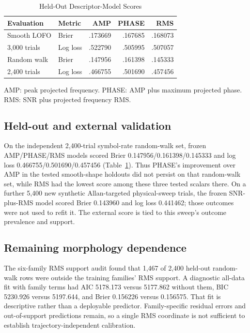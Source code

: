 \documentclass[conference]{IEEEtran}
\begin{document}
\begin{table}[t]
\caption{Held-Out Descriptor-Model Scores}
\label{tab:descriptors}
\centering\footnotesize
\begin{tabular}{llrrr}
\toprule
Evaluation & Metric & AMP & PHASE & RMS \\
\midrule
Smooth LOFO & Brier & .173669 & .167685 & .168073 \\
3,000 trials & Log loss & .522790 & .505995 & .507057 \\
Random walk & Brier & .147956 & .161398 & .145333 \\
2,400 trials & Log loss & .466755 & .501690 & .457456 \\
\bottomrule
\end{tabular}
\vspace{2pt}
\parbox{\columnwidth}{\footnotesize AMP: peak projected frequency. PHASE: AMP plus maximum projected phase. RMS: SNR plus projected frequency RMS.}
\end{table}

\subsection{Held-out and external validation}
On the independent 2,400-trial symbol-rate random-walk set, frozen AMP/PHASE/RMS models scored Brier 0.147956/0.161398/0.145333 and log loss 0.466755/0.501690/0.457456 (Table~\ref{tab:descriptors}). Thus PHASE's improvement over AMP in the tested smooth-shape holdouts did not persist on that random-walk set, while RMS had the lowest score among these three tested scalars there. On a further 5,400 new synthetic Allan-targeted physical-sweep trials, the frozen SNR-plus-RMS model scored Brier 0.143960 and log loss 0.441462; those outcomes were not used to refit it. The external score is tied to this sweep's outcome prevalence and support.

\subsection{Remaining morphology dependence}
The six-family RMS support audit found that 1,467 of 2,400 held-out random-walk rows were outside the training families' RMS support. A diagnostic all-data fit with family terms had AIC 5178.173 versus 5177.862 without them, BIC 5230.926 versus 5197.644, and Brier 0.156226 versus 0.156575. That fit is descriptive rather than a deployable predictor. Family-specific residual errors and out-of-support predictions remain, so a single RMS coordinate is not sufficient to establish trajectory-independent calibration.
\end{document}
